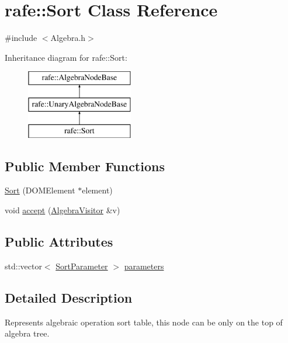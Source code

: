 \hypertarget{classrafe_1_1_sort}{\section{rafe\+:\+:Sort Class Reference}
\label{classrafe_1_1_sort}
}


{\ttfamily \#include $<$Algebra.\+h$>$}

Inheritance diagram for rafe\+:\+:Sort\+:\begin{figure}[H]
\begin{center}
\leavevmode
\includegraphics[height=3.000000cm]{classrafe_1_1_sort}
\end{center}
\end{figure}
\subsection*{Public Member Functions}
\begin{DoxyCompactItemize}
\item 
\hyperlink{classrafe_1_1_sort_a4c374a04eac099ca17162b128f68f191}{Sort} (D\+O\+M\+Element $\ast$element)
\item 
void \hyperlink{classrafe_1_1_sort_a275b43c089710e24876f332177ca49c5}{accept} (\hyperlink{classrafe_1_1_algebra_visitor}{Algebra\+Visitor} \&v)
\end{DoxyCompactItemize}
\subsection*{Public Attributes}
\begin{DoxyCompactItemize}
\item 
std\+::vector$<$ \hyperlink{classrafe_1_1_sort_parameter}{Sort\+Parameter} $>$ \hyperlink{classrafe_1_1_sort_a56fff2e57e874999e0bc44772b090129}{parameters}
\end{DoxyCompactItemize}


\subsection{Detailed Description}
Represents algebraic operation sort table, this node can be only on the top of algebra tree. 


